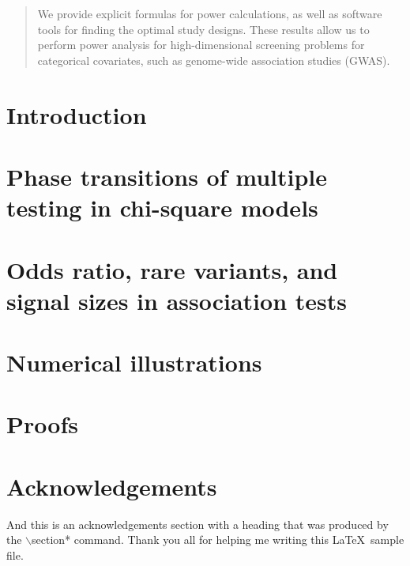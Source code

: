 \documentclass[ejs]{imsart}
\numberwithin{equation}{section}
\theoremstyle{plain}
\theoremstyle{remark}
\begin{document}
\begin{frontmatter}
\begin{abstract}
We provide explicit formulas for power calculations, as well as software tools for finding the optimal study designs.
These results allow us to perform power analysis for high-dimensional screening problems for categorical covariates, such as genome-wide association studies (GWAS).
\end{abstract}

\begin{keyword}[class=MSC]
\end{keyword}

\begin{keyword}
\end{keyword}
\tableofcontents
\end{frontmatter}

\section{Introduction}
\label{sec:intro}


\section{Phase transitions of multiple testing in chi-square models}
\label{sec:chisq-boundaries}


\section{Odds ratio, rare variants, and signal sizes in association tests}
\label{sec:signal-size-odds-ratio}


\section{Numerical illustrations}
\label{sec:numerical}


\appendix
\section{Proofs}
\label{sec:proofs}



\section*{Acknowledgements}
And this is an acknowledgements section with a heading that was produced by the
$\backslash$section* command. Thank you all for helping me writing this
\LaTeX\ sample file.
\end{document}
